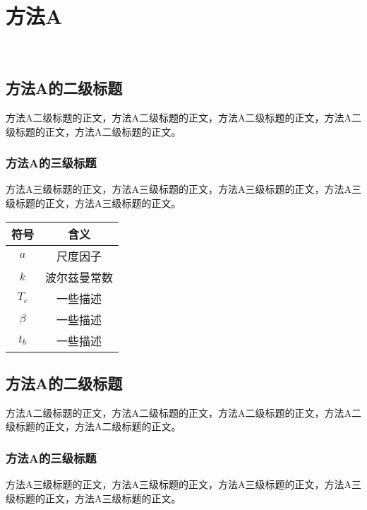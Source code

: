 \section{方法A\label{方法A}}

\begin{figure}[htb]
    \centering
    \\
    \captionsetup{font=footnotesize}
    \label{fig:幂律参数空间A}
\end{figure}

\subsection{方法A的二级标题}

方法A二级标题的正文，方法A二级标题的正文，方法A二级标题的正文，方法A二级标题的正文，方法A二级标题的正文。

\subsubsection{方法A的三级标题}

方法A三级标题的正文，方法A三级标题的正文，方法A三级标题的正文，方法A三级标题的正文，方法A三级标题的正文。

\begin{table}[htb]
    \centering
    \captionsetup{font=footnotesize}
    \label{tab:符号对照表A}
    \begin{tabular}{@{}cc@{}}
        \toprule
        符号     & 含义       \\ 
        \midrule
        $a$     & 尺度因子    \\
        $k$     & 波尔兹曼常数 \\
        $T_c$   & 一些描述    \\
        $\beta$ & 一些描述    \\
        $t_b$   & 一些描述    \\
        \bottomrule
    \end{tabular}
\end{table}


\subsection{方法A的二级标题}

方法A二级标题的正文，方法A二级标题的正文，方法A二级标题的正文，方法A二级标题的正文，方法A二级标题的正文。

\subsubsection{方法A的三级标题}

方法A三级标题的正文，方法A三级标题的正文，方法A三级标题的正文，方法A三级标题的正文，方法A三级标题的正文。